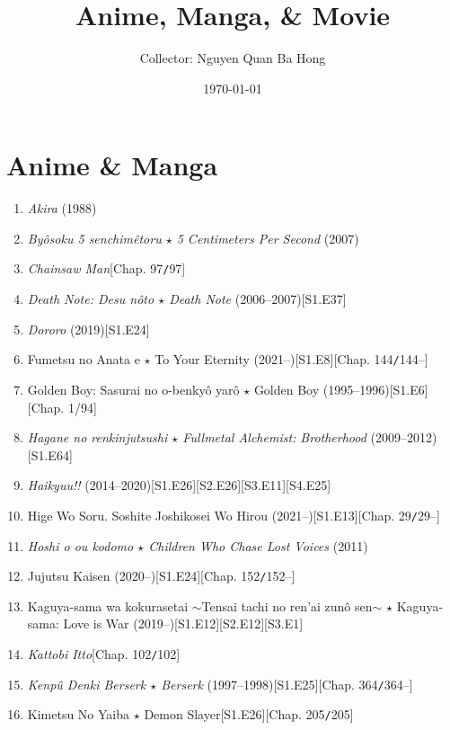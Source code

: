 \documentclass{article}
\title{Anime, Manga, {\large\&} Movie}
\author{Collector: Nguyen Quan Ba Hong}
\date{\today}
\begin{document}
\maketitle
\tableofcontents


\section{Anime \& Manga}
\begin{enumerate}
    \item \textit{Akira} (1988)
    \item \textit{By\^osoku 5 senchimêtoru $\star$ 5 Centimeters Per Second} (2007)
    \item \textit{Chainsaw Man}\hfill[Chap. 97\texttt{/}97]
    \item \textit{Death Note: Desu n\^oto $\star$ Death Note} (2006--2007)\hfill[S1.E37]
    \item \textit{Dororo} (2019)\hfill[S1.E24]
    \item Fumetsu no Anata e $\star$ To Your Eternity (2021--)\hfill[S1.E8][Chap. 144\texttt{/}144--]
    \item Golden Boy: Sasurai no o-benky\^o yar\^o $\star$ Golden Boy (1995--1996)\hfill[S1.E6][Chap. 1/94]
    \item \textit{Hagane no renkinjutsushi $\star$ Fullmetal Alchemist: Brotherhood} (2009--2012)\hfill[S1.E64]
    \item \textit{Haikyuu!!} (2014--2020)\hfill[S1.E26][S2.E26][S3.E11][S4.E25]
    \item Hige Wo Soru. Soshite Joshikosei Wo Hirou (2021--)\hfill[S1.E13][Chap. 29\texttt{/}29--]
    \item \textit{Hoshi o ou kodomo $\star$ Children Who Chase Lost Voices} (2011)
    \item Jujutsu Kaisen (2020--)\hfill[S1.E24][Chap. 152\texttt{/}152--]
    \item Kaguya-sama wa kokurasetai $\sim$Tensai tachi no ren'ai zun\^o sen$\sim$ $\star$ Kaguya-sama: Love is War (2019--)\hfill[S1.E12][S2.E12][S3.E1]
    \item \textit{Kattobi Itto}\hfill[Chap. 102\texttt{/}102]
    \item \textit{Kenp\^u Denki Berserk $\star$ Berserk} (1997--1998)\hfill[S1.E25][Chap. 364\texttt{/}364--]
    \item Kimetsu No Yaiba $\star$ Demon Slayer\hfill[S1.E26][Chap. 205\texttt{/}205]

\end{enumerate}
\end{document}
